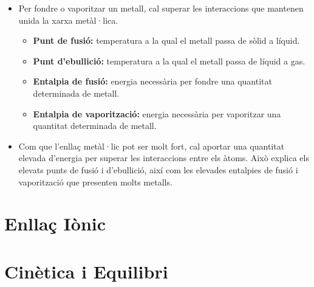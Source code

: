 \documentclass[12pt]{article}
\begin{document}
\begin{itemize}
    \item Per fondre o vaporitzar un metall, cal superar les interaccions que mantenen unida la xarxa metàl·lica.

    \begin{itemize}
        \item \textbf{Punt de fusió:} temperatura a la qual el metall passa de sòlid a líquid.

        \item \textbf{Punt d'ebullició:} temperatura a la qual el metall passa de líquid a gas.

        \item \textbf{Entalpia de fusió:} energia necessària per fondre una quantitat determinada de metall.

        \item \textbf{Entalpia de vaporització:} energia necessària per vaporitzar una quantitat determinada de metall.
    \end{itemize}

    \item Com que l'enllaç metàl·lic pot ser molt fort, cal aportar una quantitat elevada d'energia per superar les interaccions entre els àtoms. Això explica els elevats punts de fusió i d'ebullició, així com les elevades entalpies de fusió i vaporització que presenten molts metalls.
\end{itemize}

\section{Enllaç Iònic}

\section{Cinètica i Equilibri}
\end{document}
